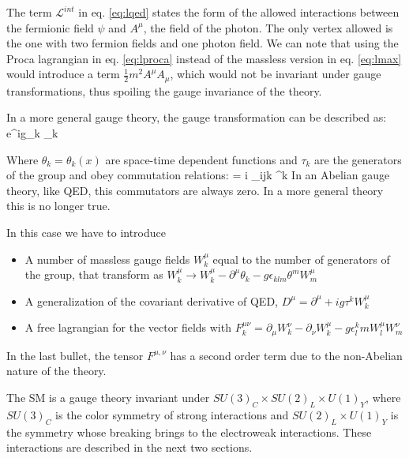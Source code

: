 The term $\mathcal{L}^{int}$ in eq. \ref{eq:lqed} states the form of the allowed interactions between the fermionic field $\psi$ and $A^\mu$, the field of the photon. The only vertex allowed is the one with two fermion fields and one photon field. We can note that using the Proca lagrangian in eq. \ref{eq:lproca} instead of the massless version in eq. \ref{eq:lmax} would introduce a term $\frac{1}{2} m^2 A^\mu A_\mu$, which would not be invariant under gauge transformations, thus spoiling the gauge invariance of the theory.

In a more general gauge theory, the gauge transformation can be described as:
\beq
\psi \rightarrow e^{ig\theta_k \tau_k} \psi  
\eeq

Where $\theta_k = \theta_k(x)$ are space-time dependent functions and $\tau_k$ are the generators of the group and obey commutation relations: 
\beq
{} = i \epsilon_{ijk} \tau^k 
\eeq
In an Abelian gauge theory, like QED, this commutators are always zero. In a more general theory this is no longer true.

In this case we have to introduce
\begin{itemize}
\item A number of massless gauge fields $W^\mu_k$ equal to the number of generators of the group, that transform as $W^\mu_k \rightarrow W^\mu_k - \partial^\mu \theta_k - g \epsilon_{klm} \theta^m W^\mu_m $
\item A generalization of the covariant derivative of QED, $D^\mu = \partial^\mu + ig\tau^kW^\mu_k$
\item A free lagrangian for the vector fields with $F^{\mu \nu}_k = \partial_\mu W_k^\nu - \partial_\nu W_k^\mu - g \epsilon^k_lm W^\mu_l W^\nu_m$
\end{itemize}
In the last bullet, the tensor $F^{\mu,\nu}$ has a second order term due to the non-Abelian nature of the theory.

The SM is a gauge theory invariant under $SU(3)_C \times SU(2)_L \times U(1)_Y$, where $SU(3)_C$ is the color symmetry of strong interactions and $SU(2)_L \times U(1)_Y$ is the symmetry whose breaking brings to the electroweak interactions. These interactions are described in the next two sections.

